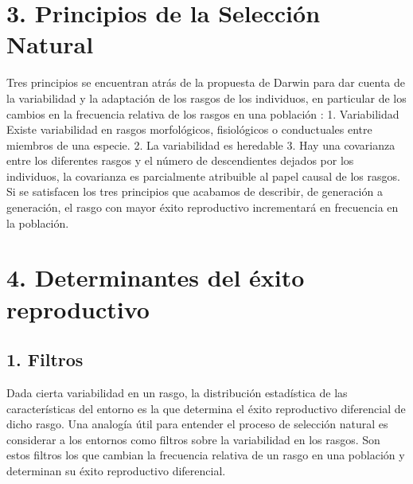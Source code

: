 \documentclass[
  letterpaper,
]{book}
\begin{document}
\section{3. Principios de la Selección
Natural}\label{principios-de-la-selecciuxf3n-natural-1}

Tres principios se encuentran atrás de la propuesta de Darwin para dar
cuenta de la variabilidad y la adaptación de los rasgos de los
individuos, en particular de los cambios en la frecuencia relativa de
los rasgos en una población : 1. Variabilidad Existe variabilidad en
rasgos morfológicos, fisiológicos o conductuales entre miembros de una
especie. 2. La variabilidad es heredable 3. Hay una covarianza entre los
diferentes rasgos y el número de descendientes dejados por los
individuos, la covarianza es parcialmente atribuible al papel causal de
los rasgos. Si se satisfacen los tres principios que acabamos de
describir, de generación a generación, el rasgo con mayor éxito
reproductivo incrementará en frecuencia en la población.

\section{4. Determinantes del éxito
reproductivo}\label{determinantes-del-uxe9xito-reproductivo}

\subsection{1. Filtros}\label{filtros}

Dada cierta variabilidad en un rasgo, la distribución estadística de las
características del entorno es la que determina el éxito reproductivo
diferencial de dicho rasgo. Una analogía útil para entender el proceso
de selección natural es considerar a los entornos como filtros sobre la
variabilidad en los rasgos. Son estos filtros los que cambian la
frecuencia relativa de un rasgo en una población y determinan su éxito
reproductivo diferencial.
\end{document}

